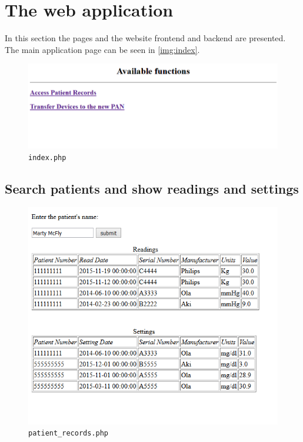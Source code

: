 \documentclass[a4paper,11pt]{article}
\begin{document}




\pagebreak
\section{The web application}

In this section the pages and the website frontend and backend are presented. The main application page can be seen in \autoref{img:index}.

\begin{figure}[h]
    \centering
    \includegraphics[width=.8\textwidth]{img/index}
    \caption{\texttt{index.php}}
    \label{img:index}
\end{figure}


\subsection{Search patients and show readings and settings}

\begin{figure}[h]
    \centering
    \includegraphics[width=.8\textwidth]{img/Registos}
    \caption{\texttt{patient\_records.php}}
    \label{img:patient_records}
\end{figure}
\end{document}
